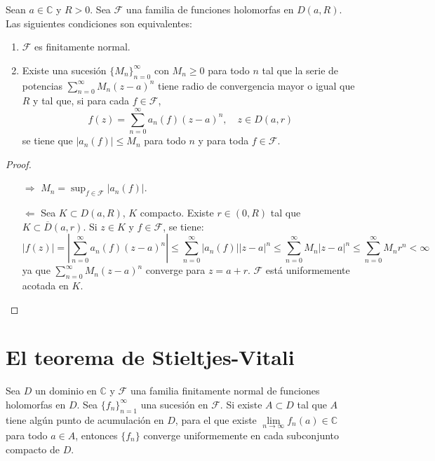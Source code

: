 \begin{theorem}
    Sean $a \in \mathbb{C}$ y $R > 0$.
    Sea $\mathcal{F}$ una familia de funciones holomorfas en $D(a, R)$.
    Las siguientes condiciones son equivalentes:
    \begin{enumerate}
        \item $\mathcal{F}$ es finitamente normal.
        \item Existe una sucesión $\{M_n\}_{n=0}^\infty$ con $M_n \geq 0$ para todo $n$ tal que la serie de potencias $\sum_{n=0}^\infty M_n(z-a)^n$ tiene radio de convergencia mayor o igual que $R$ y tal que, si para cada $f \in \mathcal{F}$,
              $$f(z) = \sum_{n=0}^\infty a_n(f)(z-a)^n, \quad z \in D(a, r)$$
              se tiene que $|a_n(f)| \leq M_n$ para todo $n$ y para toda $f \in \mathcal{F}$.
    \end{enumerate}
\end{theorem}

\begin{proof}
    \hfill
    \begin{itemize}
        \item[$\Rightarrow$] $M_n = \sup_{f \in \mathcal{F}} |a_n(f)|$.
        \item[$\Leftarrow$] Sea $K \subset D(a, R)$, $K$ compacto.
            Existe $r \in (0, R)$ tal que $K \subset \overline{D}(a, r)$.
            Si $z \in K$ y $f \in \mathcal{F}$, se tiene:
            $$|f(z)| = \left|\sum_{n=0}^\infty a_n(f)(z-a)^n\right| \leq \sum_{n=0}^\infty |a_n(f)||z-a|^n \leq \sum_{n=0}^\infty M_n|z-a|^n \leq \sum_{n=0}^\infty M_nr^n < \infty$$
            ya que $\sum_{n=0}^\infty M_n(z-a)^n$ converge para $z = a+r$.
            $\mathcal{F}$ está uniformemente acotada en $K$.
    \end{itemize}
\end{proof}

\section{El teorema de Stieltjes-Vitali}
\begin{theorem}
    Sea $D$ un dominio en $\mathbb{C}$ y $\mathcal{F}$ una familia finitamente normal de funciones holomorfas en $D$.
    Sea $\{f_n\}_{n=1}^\infty$ una sucesión en $\mathcal{F}$.
    Si existe $A \subset D$ tal que $A$ tiene algún punto de acumulación en $D$, para el que existe $\lim\limits_{n \to \infty} f_n(a) \in \mathbb{C}$ para todo $a \in A$, entonces $\{f_n\}$ converge uniformemente en cada subconjunto compacto de $D$.
\end{theorem}

